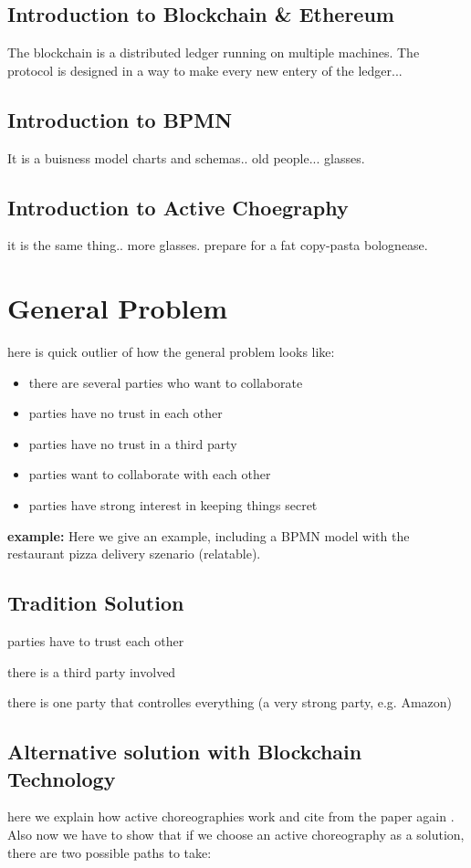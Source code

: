 \documentclass[runningheads]{llncs}
\begin{document}
\subsection{Introduction to Blockchain \& Ethereum}
The blockchain is a distributed ledger running on multiple machines. The protocol is designed in a way to make every new entery of the ledger...

\subsection{Introduction to BPMN}
It is a buisness model charts and schemas.. old people... glasses.

\subsection{Introduction to Active Choegraphy}
it is the same thing.. more glasses. \cite{weber2016untrusted} prepare for a fat copy-pasta bolognease.

\section{General Problem}
here is quick outlier of how the general problem looks like: 
\begin{itemize}
    \item there are several parties who want to collaborate 
    \item parties have no trust in each other 
    \item parties have no trust in a third party
    \item parties want to collaborate with each other
    \item parties have strong interest in keeping things secret
\end{itemize}

\textbf{example:} Here we give an example, including a BPMN model with the restaurant pizza delivery szenario (relatable).

\subsection{Tradition Solution}
parties have to trust each other 

there is a third party involved

there is one party that controlles everything (a very strong party, e.g. Amazon)


\subsection{Alternative solution with Blockchain Technology}
here we explain how active choreographies work and cite from the paper again \cite{weber2016untrusted}. Also now we have to show that if we choose an active choreography as a solution, there are two possible paths to take: 
\end{document}
